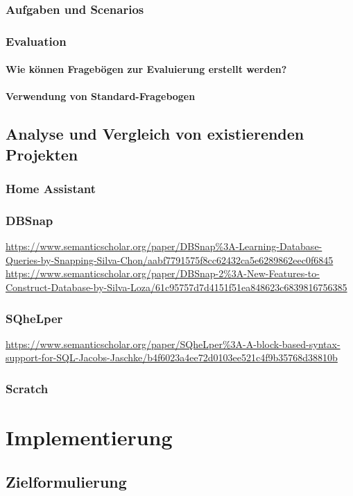 \documentclass[a4paper, 12pt, oneside, BCOR=1cm,toc=chapterentrywithdots]{scrbook}
\begin{document}
\subsection{Aufgaben und Scenarios}
\subsection{Evaluation}
\subsubsection{Wie können Fragebögen zur Evaluierung erstellt werden?}
\subsubsection{Verwendung von Standard-Fragebogen}

\section{Analyse und Vergleich von existierenden Projekten}
\subsection{Home Assistant}
\subsection{DBSnap}
\url{https://www.semanticscholar.org/paper/DBSnap\%3A-Learning-Database-Queries-by-Snapping-Silva-Chon/aabf7791575f8cc62432ca5e6289862eec0f6845}
\url{https://www.semanticscholar.org/paper/DBSnap-2\%3A-New-Features-to-Construct-Database-by-Silva-Loza/61c95757d7d4151f51ea848623c6839816756385}
\subsection{SQheLper}
\url{https://www.semanticscholar.org/paper/SQheLper\%3A-A-block-based-syntax-support-for-SQL-Jacobs-Jaschke/b4f6023a4ee72d0103ee521c4f9b35768d38810b}
\subsection{Scratch}


\chapter{Implementierung}
\section{Zielformulierung}
\end{document}
